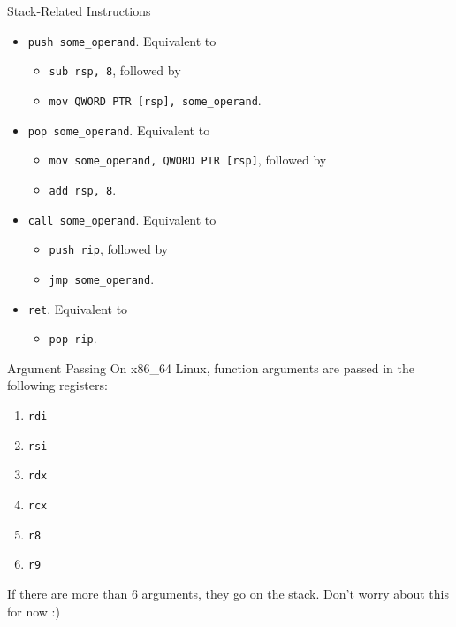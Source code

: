 \documentclass[hyphens,aspectratio=169]{beamer}
\begin{document}
\begin{frame}[fragile]{Stack-Related Instructions}
    \begin{itemize}
        \pause \item \texttt{push some\_operand}. Equivalent to
            \begin{itemize}
                \pause \item \texttt{sub rsp, 8}, followed by
                \pause \item \texttt{mov QWORD PTR [rsp], some\_operand}.
            \end{itemize}
        \pause \item \texttt{pop some\_operand}. Equivalent to
            \begin{itemize}
                \pause \item \texttt{mov some\_operand, QWORD PTR [rsp]}, followed by
                \pause \item \texttt{add rsp, 8}.
            \end{itemize}
        \pause \item \texttt{call some\_operand}. Equivalent to
            \begin{itemize}
                \pause \item \texttt{push rip}, followed by
                \pause \item \texttt{jmp some\_operand}.
            \end{itemize}
        \pause \item \texttt{ret}. Equivalent to
            \begin{itemize}
                \pause \item \texttt{pop rip}.
            \end{itemize}
    \end{itemize}
\end{frame}

\begin{frame}[fragile]{Argument Passing}
    On x86\_64 Linux, function arguments are passed in the following registers:
    \begin{enumerate}
        \pause \item \texttt{rdi}
        \pause \item \texttt{rsi}
        \pause \item \texttt{rdx}
        \pause \item \texttt{rcx}
        \pause \item \texttt{r8}
        \pause \item \texttt{r9}
    \end{enumerate}

    \pause If there are more than 6 arguments, they go on the stack.
    Don't worry about this for now :)
\end{frame}
\end{document}
